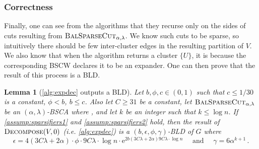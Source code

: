 \documentclass[epsfig,letter,11pt]{article}
\numberwithin{equation}{section}
\newcommand{\bsc}{\textsc{BalSparseCut}_{\alpha,\lambda}}
\newcommand{\ed}{\textsc{Decompose}}
\newcommand{\e}{\mathrm{e}}
\newtheorem{lemma}[theorem]{Lemma}
\begin{document}
\subsubsection{Correctness}
\label{subsubsec:correct}

Finally, one can see from the algorithms that they recurse only on the sides of cuts resulting from $\bsc$. We know such cuts to be sparse, so intuitively there should be few inter-cluster edges in the resulting partition of $V$. We also know that when the algorithm returns a cluster $\{U\}$, it is because the corresponding BSCW declares it to be an expander. One can then prove that the result of this process is a BLD.

\begin{lemma}[\cref{alg:expdec} outputs a BLD]
	\label{lem:bld}
	Let $b, \phi,c \in (0,1)$ such that $c \le 1/30$ is a constant, $\phi < b$, $b \le c$. Also let $C \ge 31$ be a constant, let $\bsc$ be an $(\alpha,\lambda)$-BSCA where , and let $k$ be an integer such that $k \le \log n$. If \cref{assump:sparsifiers1} and \cref{assump:sparsifiers2} hold, then the result of $\ed(V,0)$ (i.e. \cref{alg:expdec}) 
	is a $(b,\epsilon,\phi,\gamma)$-BLD of $G$ where
	\begin{equation*}
		\epsilon = 4 (3C\lambda+2\alpha) \cdot \phi \cdot 9C\lambda \cdot \log n \cdot  \e^{2b (3C\lambda+2\alpha) 9C\lambda \cdot \log n} \quad \text{ and } \quad \gamma = 6 \alpha^{k+1} \, .
	\end{equation*}
\end{lemma}
\end{document}
